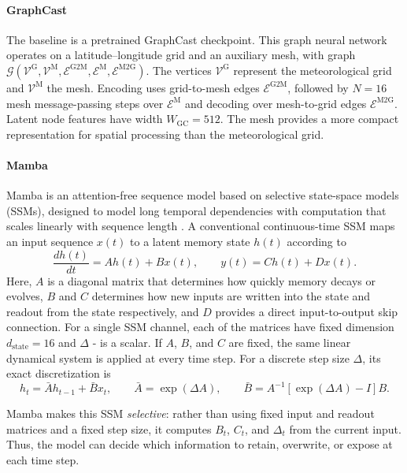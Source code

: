 \documentclass{article}
\begin{document}
\paragraph{GraphCast}
The baseline is a pretrained GraphCast checkpoint. This graph neural network operates on a latitude--longitude grid and an auxiliary mesh, with graph $\mathcal{G}(\mathcal{V}^{\textrm{G}},\mathcal{V}^{\textrm{M}},\mathcal{E}^{\textrm{G2M}},\mathcal{E}^{\textrm{M}},\mathcal{E}^{\textrm{M2G}})$. The vertices $\mathcal{V}^{\textrm{G}}$ represent the meteorological grid and $\mathcal{V}^{\textrm{M}}$ the mesh. Encoding uses grid-to-mesh edges $\mathcal{E}^{\textrm{G2M}}$, followed by $N=16$ mesh message-passing steps over $\mathcal{E}^{\textrm{M}}$ and decoding over mesh-to-grid edges $\mathcal{E}^{\textrm{M2G}}$. Latent node features have width $W_{\textrm{GC}}=512$. The mesh provides a more compact representation for spatial processing than the meteorological grid.

\paragraph{Mamba}
Mamba is an attention-free sequence model based on selective state-space models (SSMs), designed to model long temporal dependencies with computation that scales linearly with sequence length \cite{gu2023Mamba}. A conventional continuous-time SSM maps an input sequence $x(t)$ to a latent memory state $h(t)$ according to
\begin{equation}
    \frac{d h(t)}{dt} = A h(t) + B x(t),
    \qquad
    y(t) = C h(t) + D x(t).
\end{equation}
Here, $A$ is a diagonal matrix that determines how quickly memory decays or evolves, $B$ and $C$ determines how new inputs are written into the state and readout from the state respectively, and $D$ provides a direct input-to-output skip connection. For a single SSM channel, each of the matrices have fixed dimension $d_{\textrm{state}}=16$ and $\Delta$ - is a scalar. If $A$, $B$, and $C$ are fixed, the same linear dynamical system is applied at every time step. For a discrete step size $\Delta$, its exact discretization is
\begin{equation}
    h_t = \bar{A} h_{t-1} + \bar{B}x_t,
    \qquad
    \bar{A} = \exp(\Delta A),
    \qquad
    \bar{B} = A^{-1}\left[\exp(\Delta A)-I\right]B.
\end{equation}

Mamba makes this SSM \emph{selective}: rather than using fixed input and readout matrices and a fixed step size, it computes $B_t$, $C_t$, and $\Delta_t$ from the current input. Thus, the model can decide which information to retain, overwrite, or expose at each time step.
\end{document}
